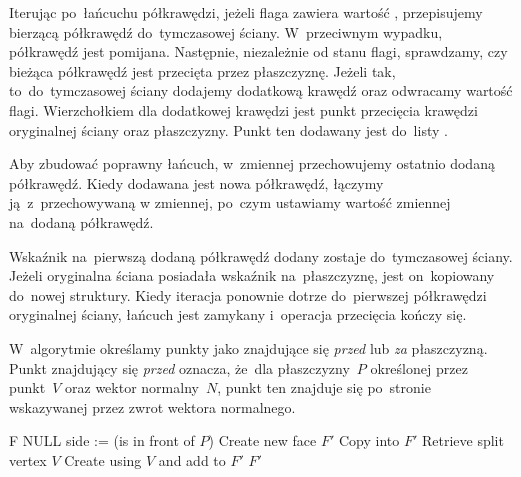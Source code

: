 \documentclass[skorowidz,autorrok,backref,xodstep,oswiadczenie]{wmimgr}
\begin{document}
Iterując po~łańcuchu półkrawędzi, jeżeli flaga  zawiera wartość , przepisujemy bierzącą półkrawędź do~tymczasowej ściany. W~przeciwnym wypadku, półkrawędź jest pomijana. Następnie, niezależnie od stanu flagi, sprawdzamy, czy bieżąca półkrawędź jest przecięta przez płaszczyznę. Jeżeli tak, to~do~tymczasowej ściany dodajemy dodatkową krawędź oraz odwracamy wartość flagi. Wierzchołkiem dla dodatkowej krawędzi jest punkt przecięcia krawędzi oryginalnej ściany oraz płaszczyzny. Punkt ten dodawany jest do~listy .

Aby zbudować poprawny łańcuch, w~zmiennej  przechowujemy ostatnio dodaną półkrawędź. Kiedy dodawana jest nowa półkrawędź, łączymy ją~z~przechowywaną w zmiennej, po~czym ustawiamy wartość zmiennej na~dodaną półkrawędź.

Wskaźnik na~pierwszą dodaną półkrawędź dodany zostaje do~tymczasowej ściany. Jeżeli oryginalna ściana posiadała wskaźnik na~płaszczyznę, jest on~kopiowany do~nowej struktury. Kiedy iteracja ponownie dotrze do~pierwszej półkrawędzi oryginalnej ściany, łańcuch jest zamykany i~operacja przecięcia kończy się.

W~algorytmie określamy punkty jako znajdujące się \emph{przed} lub \emph{za} płaszczyzną. Punkt znajdujący się \emph{przed} oznacza, że~dla płaszczyzny~$P$ określonej przez punkt~$V$ oraz wektor normalny~$N$, punkt ten znajduje się po~stronie wskazywanej przez zwrot wektora normalnego.

\begin{algorithm}
\caption{$CutFace(F, P)$}
\label{CutFace}
\begin{algorithmic}
        \RETURN F
    \ENDIF
        \RETURN NULL
    \ENDIF
    \STATE {}
    \STATE side := (is  in front of $P$)
    \STATE Create new face $F'$
    \REPEAT
            \STATE Copy  into $F'$
        \ENDIF
            \STATE Retrieve split vertex $V$
            \STATE Create  using $V$ and add to $F'$
            \STATE {}
        \ENDIF
        \STATE {}
    \RETURN $F'$
\end{algorithmic}
\end{algorithm}
\end{document}
